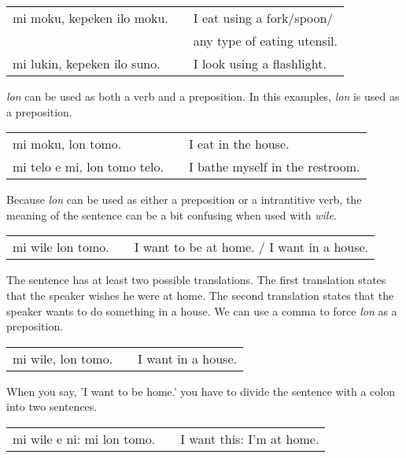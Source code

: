 \begin{supertabular}{p{5,5cm}|ll}
mi moku, kepeken ilo moku. && I eat using a fork/spoon/ \\ && any type of eating utensil. \\
mi lukin, kepeken ilo suno. && I look using a flashlight.  \\
\end{supertabular} 

%
%
\textit{lon} can be used as both a verb and a preposition. 
In this examples, \textit{lon} is used as a preposition.

\begin{supertabular}{p{5,5cm}|ll}
mi moku, lon tomo. && I eat in the house. \\
mi telo e mi, lon tomo telo. && I bathe myself in the restroom. \\
\end{supertabular} 

Because \textit{lon} can be used as either a preposition or a intrantitive verb, the meaning of the sentence can be a bit confusing when used with \textit{wile}. 

\begin{supertabular}{p{5,5cm}|ll}
mi wile lon tomo. && I want to be at home. / I want in a house. \\
\end{supertabular} 

%
The sentence has at least two possible translations. 
The first translation states that the speaker wishes he were at home. 
The second translation states that the speaker wants to do something in a house. 
We can use a comma to force \textit{lon} as a preposition.

\begin{supertabular}{p{5,5cm}|ll}
mi wile, lon tomo. && I want in a house. \\
\end{supertabular}

When you say, 'I want to be home.' you have to divide the sentence with a colon into two sentences.

\begin{supertabular}{p{5,5cm}|ll}
mi wile e ni: mi lon tomo. && I want this: I'm at home. \\
\end{supertabular} 


